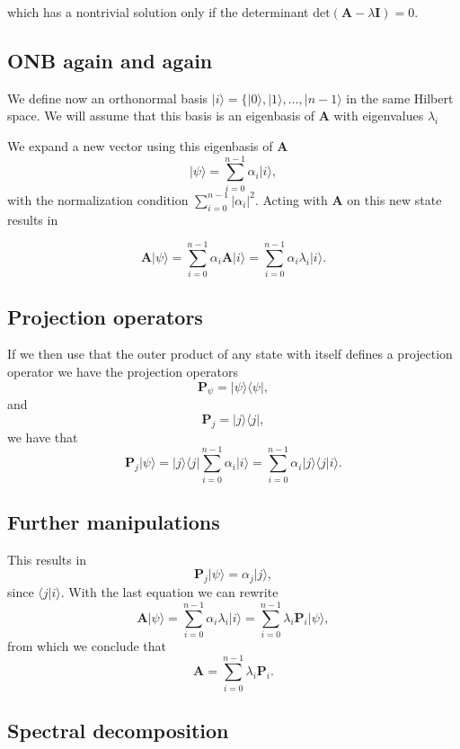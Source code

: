 which has a nontrivial solution only if the determinant
$\mathrm{det}(\bm{A}-\lambda\bm{I})=0$.

\subsection{ONB again and again}

We define now an orthonormal basis $\vert i \rangle =\{\vert 0
\rangle, \vert 1\rangle, \dots, \vert n-1\rangle$ in the same Hilbert
space. We will assume that this basis is an eigenbasis of $\bm{A}$ with eigenvalues $\lambda_i$

We expand a new vector using this eigenbasis of $\bm{A}$
\[
\vert \psi \rangle = \sum_{i=0}^{n-1}\alpha_i\vert i\rangle,
\]
with the normalization condition $\sum_{i=0}^{n-1}\vert \alpha_i\vert^2$.
Acting with $\bm{A}$ on this new state results in

\[
\bm{A}\vert \psi \rangle = \sum_{i=0}^{n-1}\alpha_i\bm{A}\vert i\rangle=\sum_{i=0}^{n-1}\alpha_i\lambda_i\vert i\rangle.
\]

\subsection{Projection operators}

If we then use that the outer product of any state with itself defines a projection operator we have the projection operators
\[
\bm{P}_{\psi} = \vert \psi\rangle\langle \psi\vert,
\]
and
\[
\bm{P}_{j} = \vert j\rangle\langle j\vert,
\]
we have that 
\[
\bm{P}_{j}\vert \psi\rangle=\vert j\rangle\langle j\vert\sum_{i=0}^{n-1}\alpha_i\vert i\rangle=\sum_{i=0}^{n-1}\alpha_i\vert j\rangle\langle j\vert i\rangle.
\]

\subsection{Further manipulations}

This results in
\[
\bm{P}_{j}\vert \psi\rangle=\alpha_j\vert j\rangle,
\]
since $\langle j\vert i\rangle$.
With the last equation we can rewrite
\[
\bm{A}\vert \psi \rangle = \sum_{i=0}^{n-1}\alpha_i\lambda_i\vert i\rangle=\sum_{i=0}^{n-1}\lambda_i\bm{P}_i\vert \psi\rangle,
\]
from which we conclude that
\[
\bm{A}=\sum_{i=0}^{n-1}\lambda_i\bm{P}_i.
\]

\subsection{Spectral decomposition}

